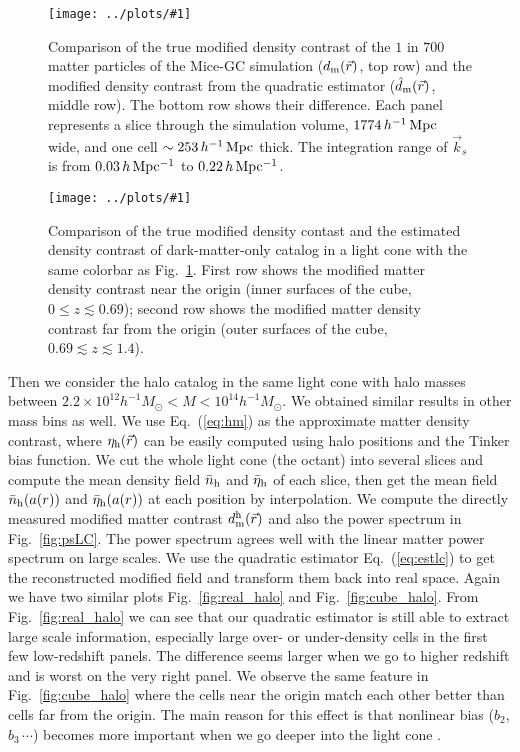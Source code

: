 \documentclass[prd,amsmath,amssymb,floatfix,superscriptaddress,nofootinbib,twocolumn]{revtex4-1}
\newcommand{\vrr}{\vec{r}}
\newcommand{\vk}{\vec{k}}
\newcommand{\ec}[1]{Eq.~(\ref{eq:#1})}
\newcommand{\rf}[1]{\ref{fig:#1}}
\newcommand{\sfig}[2]{
\texttt{[image: ../plots/\#1]}
        }
\newcommand{\Sfig}[2]{
   \begin{figure}[thbp]
   \begin{center}
    \sfig{../plots/#1.pdf}{\columnwidth}
    \caption{{\small #2}}
    \label{fig:#1}
     \end{center}
   \end{figure}
}
\begin{document}
\Sfig{real_dm}{Comparison of the true modified density contrast of the $1$ in $700$ matter particles of the Mice-GC simulation ($d_{\rm m}(\vrr)$, top row) and the modified density contrast from the quadratic estimator ($\hat{d}_{\rm m}(\vrr)$, middle row). The bottom row shows their difference. Each panel represents a slice through the simulation volume, $1774\,h^{-1}\rm \, Mpc$ wide, and one cell $\sim 253\,h^{-1}\rm \, Mpc$ thick. The integration range of $\vk_{s}$ is from $0.03\, h \rm \, Mpc^{-1}$ to $0.22\, h \rm \, Mpc^{-1}$.}
\Sfig{cube_dm}{Comparison of the true modified density contast and the estimated density contrast of dark-matter-only catalog in a light cone with the same colorbar as Fig.~\rf{real_dm}. First row shows the modified matter density contrast near the origin (inner surfaces of the cube, $0\leqslant z \lesssim 0.69$); second row shows the modified matter density contrast far from the origin (outer surfaces of the cube, $0.69\lesssim z \lesssim 1.4$).}

Then we consider the halo catalog in the same light cone with halo masses between $2.2 \times 10^{12}h^{-1}M_{\odot}<M < 10^{14}h^{-1}M_{\odot}$. We obtained similar results in other mass bins as well. We use \ec{hm} as the approximate matter density contrast, where $\eta_{\rm h}(\vrr)$ can be easily computed using halo positions and the Tinker bias function. We cut the whole light cone (the octant) into several slices and compute the mean density field $\bar{{n}}_{\rm h}$ and $\bar{\eta}_{\rm h}$ of each slice, then get the mean field  $\bar{{n}}_{\rm h}(a(r))$ and $\bar{\eta}_{\rm h}(a(r))$ at each position by interpolation. We compute the directly measured modified matter contrast $d_{\rm m}^{\rm h}(\vrr)$ and also the power spectrum in Fig.~\rf{psLC}. The power spectrum agrees well with the linear matter power spectrum on large scales. We use the quadratic estimator \ec{estlc} to get the reconstructed modified field and transform them back into real space. Again we have two similar plots Fig.~\rf{real_halo} and Fig.~\rf{cube_halo}. From Fig.~\rf{real_halo} we can see that our quadratic estimator is still able to extract large scale information, especially large over- or under-density cells in the first few low-redshift panels. The difference seems larger when we go to higher redshift and is worst on the very right panel. We observe the same feature in Fig.~\rf{cube_halo} where the cells near the origin match each other better than cells far from the origin. The main reason for this effect is that nonlinear bias ($b_{2}$, $b_{3}\,\cdots$) becomes more important when we go deeper into the light cone \cite{Lazeyras:2016nbs}.
\end{document}
